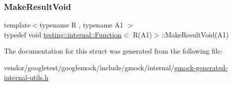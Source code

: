 \subsubsection{\texorpdfstring{Make\+Result\+Void}{MakeResultVoid}}
{\footnotesize\ttfamily template$<$typename R , typename A1 $>$ \\
typedef void \hyperlink{structtesting_1_1internal_1_1_function}{testing\+::internal\+::\+Function}$<$ R(A1)$>$\+::Make\+Result\+Void(A1)}



The documentation for this struct was generated from the following file\+:\begin{DoxyCompactItemize}
\item 
vendor/googletest/googlemock/include/gmock/internal/\hyperlink{gmock-generated-internal-utils_8h}{gmock-\/generated-\/internal-\/utils.\+h}\end{DoxyCompactItemize}
